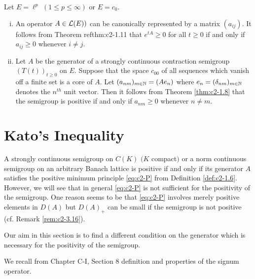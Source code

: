 \begin{examples}\label{ex:c2-1.13}
Let $E = \ell^p$ $(1 \leq p \leq \infty)$ or $E = c_{0}$.
\begin{enumerate}[(i)]
\item \label{ex:c2-1.13-1}
An operator $A \in \mathcal{L}(E))$ can be canonically represented by a matrix $(a_{ij})$.
It follows from Theorem ref{thm:c2-1.11} that $e^{tA} \geq 0$ for all $t \geq 0$ if and only if $a_{ij} \geq 0$ whenever $i \neq j$.
\item \label{ex:c2-1.13-2}
Let $A$ be the generator of a strongly continuous contraction semigroup $(T(t))_{t \geq 0}$ on $E$.
Suppose that the space $c_{00}$ of all sequences which vanish off a finite set is a core of $A$.
Let $(a_{nm})_{m \in \mathbb{N}} = (Ae_{n})$ where $e_{n} = (\delta_{nm})_{m \in \mathbb{N}}$ denotes the $n^{th}$ unit vector.
Then it follows from Theorem \ref{thm:c2-1.8}   that the semigroup is positive if and only if $a_{nm} \geq 0$ whenever $n \neq m$.
\end{enumerate}
\end{examples}

\section{Kato's Inequality} \label{sec:c2-2}

A strongly continuous semigroup on $C(K)$ $(K$ compact$)$ or a norm continuous semigroup on an arbitrary Banach lattice is positive if and only if its generator $A$ satisfies the positive minimum principle \ref{eq:c2-P} from Definition \ref{def:c2-1.6}.
However, we will see that in general \ref{eq:c2-P} is not sufficient for the positivity of the semigroup.
One reason seems to be that \ref{eq:c2-P} involves merely positive elements in $D(A)$ but $D(A)_{+}$ can be small if the semigroup is not positive (cf. Remark \ref{rem:c2-3.16}).

Our aim in this section is to find a different condition on the generator which is necessary for the positivity of the semigroup.

We recall from Chapter C-I, Section 8 
definition and properties of the signum operator.

